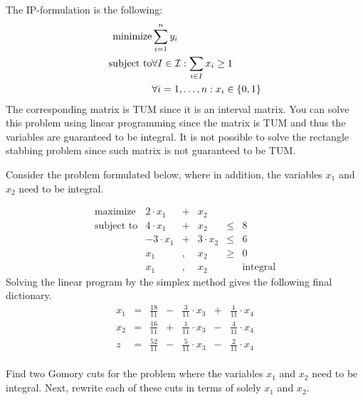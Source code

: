 \begin{answer}
The IP-formulation is the following:
\begin{eqnarray}
\mbox{minimize}&\sumieqb[i]{1}{n}{y_i}\eqnlab{rsv-m}\\
\mbox{subject to}&\forall I\in\calI:\sumdomain[i]{I}{x_{i}}\geq 1\eqnlab{rsv-c1}\\
&\forall\rangei[i]{1}{n}:x_i\in\accl{0,1}\eqnlab{rsv-c2}
\end{eqnarray}
The corresponding matrix is TUM since it is an interval matrix. You can solve this problem using linear programming since the matrix is TUM and thus the variables are guaranteed to be integral. It is not possible to solve the rectangle stabbing problem since such matrix is not guaranteed to be TUM.
\end{answer}
\begin{exercise}
Consider the problem formulated below, where in addition, the variables $x_1$ and $x_2$ need to be integral.

\begin{equation}
\begin{array}{rrcrcr}
\mbox{maximize}&2\cdot x_1&+&x_2\\
\mbox{subject to}&4\cdot x_1&+&x_2&\leq&8\\
&-3\cdot x_1&+&3\cdot x_2&\leq&6\\
&x_1&,&x_2&\geq&0\\
&x_1&,&x_2&&\mbox{integral}
\end{array}
\end{equation}
Solving the linear program by the simplex method gives the following final dictionary.
\begin{equation}
\begin{array}{rcrcrcr}
x_1&=&\tfrac{18}{11}&-&\tfrac{3}{11}\cdot x_3&+&\tfrac{1}{11}\cdot x_4\\
x_2&=&\tfrac{16}{11}&+&\tfrac{1}{11}\cdot x_3&-&\tfrac{4}{11}\cdot x_4\\\hline
z&=&\tfrac{52}{11}&-&\tfrac{5}{11}\cdot x_3&-&\tfrac{2}{11}\cdot x_4
\end{array}
\end{equation}
\paragraph{}
Find two Gomory cuts for the problem where the variables $x_1$ and $x_2$ need to be integral. Next, rewrite each of these cuts in terms of solely $x_1$ and $x_2$.
\end{exercise}
